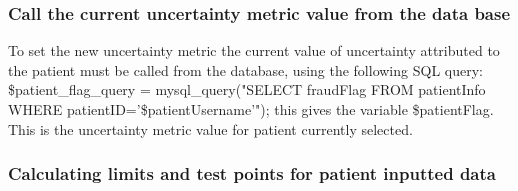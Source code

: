\documentclass[11pt]{article}
\begin{document}
\subsubsection{Call the current uncertainty metric value from the data base}

To set the new uncertainty metric the current value of uncertainty attributed to the patient must be called from the database, using the following SQL query: \$patient\_flag\_query = mysql\_query("SELECT fraudFlag FROM patientInfo WHERE patientID='\$patientUsername'"); this gives the variable \$patientFlag. This is the uncertainty metric value for patient currently selected. 

\subsubsection{Calculating limits and test points for patient inputted data}
\end{document}
